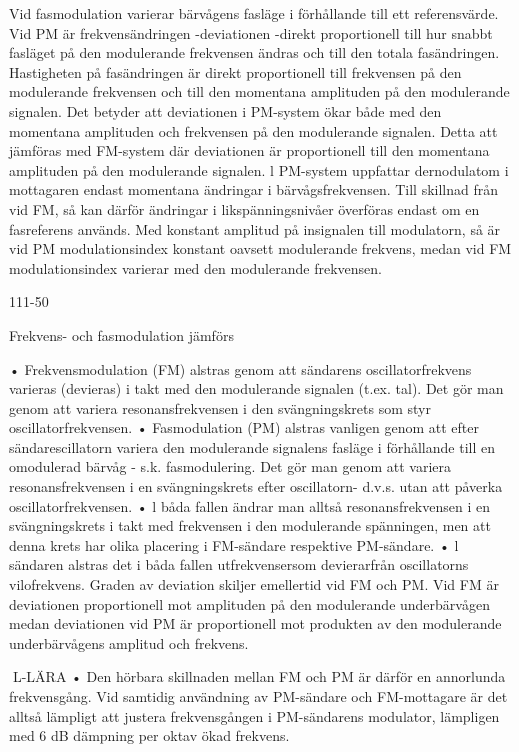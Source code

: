 \documentclass[a4paper,twoside,twocolumn,openright]{book}
\begin{document}
Vid fasmodulation varierar bärvågens fasläge i förhållande till ett referensvärde. Vid PM
är frekvensändringen -deviationen -direkt
proportionell till hur snabbt fasläget på den
modulerande frekvensen ändras och till den
totala fasändringen. Hastigheten på fasändringen är direkt proportionell till frekvensen
på den modulerande frekvensen och till den
momentana amplituden på den modulerande signalen.
Det betyder att deviationen i PM-system
ökar både med den momentana amplituden
och frekvensen på den modulerande signalen. Detta att jämföras med FM-system där
deviationen är proportionell till den momentana amplituden på den modulerande signalen.
l PM-system uppfattar dernodulatom i
mottagaren endast momentana ändringar i
bärvågsfrekvensen. Till skillnad från vid FM,
så kan därför ändringar i likspänningsnivåer
överföras endast om en fasreferens används.
Med konstant amplitud på insignalen till
modulatorn, så är vid PM modulationsindex
konstant oavsett modulerande frekvens,
medan vid FM modulationsindex varierar
med den modulerande frekvensen.

111-50

Frekvens- och fasmodulation jämförs

• Frekvensmodulation (FM) alstras genom
att sändarens oscillatorfrekvens varieras
(devieras) i takt med den modulerande
signalen (t.ex. tal). Det gör man genom att
variera resonansfrekvensen i den svängningskrets som styr oscillatorfrekvensen.
• Fasmodulation (PM) alstras vanligen genom att efter sändarescillatorn variera den
modulerande signalens fasläge i förhållande till en omodulerad bärvåg - s.k.
fasmodulering. Det gör man genom att
variera resonansfrekvensen i en svängningskrets efter oscillatorn- d.v.s. utan att
påverka oscillatorfrekvensen.
• l båda fallen ändrar man alltså resonansfrekvensen i en svängningskrets i takt med
frekvensen i den modulerande spänningen,
men att denna krets har olika placering i
FM-sändare respektive PM-sändare.
• l sändaren alstras det i båda fallen
utfrekvensersom devierarfrån oscillatorns
vilofrekvens. Graden av deviation skiljer
emellertid vid FM och PM. Vid FM är
deviationen proportionell mot amplituden
på den modulerande underbärvågen
medan deviationen vid PM är proportionell
mot produkten av den modulerande underbärvågens amplitud och frekvens.

L-LÄRA
• Den hörbara skillnaden mellan FM och PM
är därför en annorlunda frekvensgång.
Vid samtidig användning av PM-sändare
och FM-mottagare är det alltså lämpligt att
justera frekvensgången i PM-sändarens
modulator, lämpligen med 6 dB dämpning
per oktav ökad frekvens.
\end{document}
